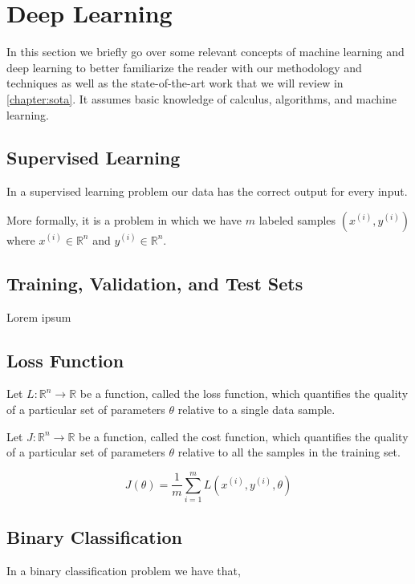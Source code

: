 \chapter{Deep Learning}
\label{chapter:deeplearning}

In this section we briefly go over some relevant concepts of machine learning and deep learning to better familiarize the reader with our methodology and techniques as well as the state-of-the-art work that we will review in \ref{chapter:sota}. It assumes basic knowledge of calculus, algorithms, and machine learning.

\section{Supervised Learning}

In a supervised learning problem our data has the correct output for every input.

More formally, it is a problem in which we have $m$ labeled samples $(x^{(i)}, y^{(i)})$ where $x^{(i)} \in \mathbb{R}^n$ and $y^{(i)} \in \mathbb{R}^n$.

\section{Training, Validation, and Test Sets}
Lorem ipsum

\section{Loss Function}

Let $L \colon \mathbb{R}^n \to \mathbb{R}$ be a function, called the loss function, which quantifies the quality of a particular set of parameters $\theta$ relative to a single data sample.

Let $J \colon \mathbb{R}^n \to \mathbb{R}$ be a function, called the cost function, which quantifies the quality of a particular set of parameters $\theta$ relative to all the samples in the training set.

$$
J(\theta) = \frac{1}{m} \sum_{i=1}^{m} L(x^{(i)}, y^{(i)}, \theta)
$$


\section{Binary Classification}

In a binary classification problem we have that,

